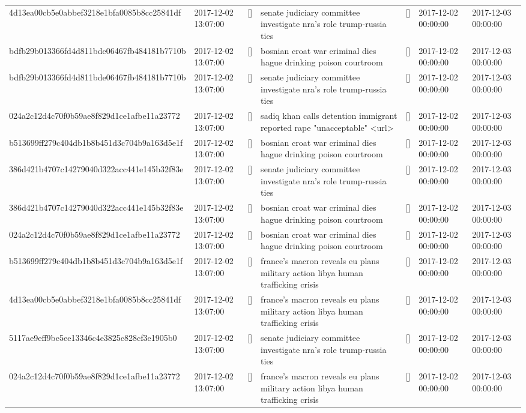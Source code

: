 \begin{tabular}{lllllll}
4d13ea00cb5e0abbef3218e1bfa0085b8cc25841df & 2017-12-02 13:07:00 & [] & senate judiciary committee investigate nra's role trump-russia ties & [] & 2017-12-02 00:00:00 & 2017-12-03 00:00:00 \\
bdfb29b013366fd4d811bde06467fb484181b7710b & 2017-12-02 13:07:00 & [] & bosnian croat war criminal dies hague drinking poison courtroom & [] & 2017-12-02 00:00:00 & 2017-12-03 00:00:00 \\
bdfb29b013366fd4d811bde06467fb484181b7710b & 2017-12-02 13:07:00 & [] & senate judiciary committee investigate nra's role trump-russia ties & [] & 2017-12-02 00:00:00 & 2017-12-03 00:00:00 \\
024a2c12d4c70f0b59ae8f829d1ce1afbe11a23772 & 2017-12-02 13:07:00 & [] & sadiq khan calls detention immigrant reported rape "unacceptable" <url> & [] & 2017-12-02 00:00:00 & 2017-12-03 00:00:00 \\
b513699ff279c404db1b8b451d3c704b9a163d5e1f & 2017-12-02 13:07:00 & [] & bosnian croat war criminal dies hague drinking poison courtroom & [] & 2017-12-02 00:00:00 & 2017-12-03 00:00:00 \\
386d421b4707c14279040d322acc441e145b32f83e & 2017-12-02 13:07:00 & [] & senate judiciary committee investigate nra's role trump-russia ties & [] & 2017-12-02 00:00:00 & 2017-12-03 00:00:00 \\
386d421b4707c14279040d322acc441e145b32f83e & 2017-12-02 13:07:00 & [] & bosnian croat war criminal dies hague drinking poison courtroom & [] & 2017-12-02 00:00:00 & 2017-12-03 00:00:00 \\
024a2c12d4c70f0b59ae8f829d1ce1afbe11a23772 & 2017-12-02 13:07:00 & [] & bosnian croat war criminal dies hague drinking poison courtroom & [] & 2017-12-02 00:00:00 & 2017-12-03 00:00:00 \\
b513699ff279c404db1b8b451d3c704b9a163d5e1f & 2017-12-02 13:07:00 & [] & france's macron reveals eu plans military action libya human trafficking crisis & [] & 2017-12-02 00:00:00 & 2017-12-03 00:00:00 \\
4d13ea00cb5e0abbef3218e1bfa0085b8cc25841df & 2017-12-02 13:07:00 & [] & france's macron reveals eu plans military action libya human trafficking crisis & [] & 2017-12-02 00:00:00 & 2017-12-03 00:00:00 \\
5117ae9eff9be5ee13346c4e3825c828cf3e1905b0 & 2017-12-02 13:07:00 & [] & senate judiciary committee investigate nra's role trump-russia ties & [] & 2017-12-02 00:00:00 & 2017-12-03 00:00:00 \\
024a2c12d4c70f0b59ae8f829d1ce1afbe11a23772 & 2017-12-02 13:07:00 & [] & france's macron reveals eu plans military action libya human trafficking crisis & [] & 2017-12-02 00:00:00 & 2017-12-03 00:00:00 \\

\end{tabular}
